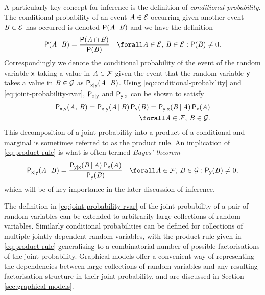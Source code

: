 A particularly key concept for inference is the definition of \emph{conditional probability}. The conditional probability of an event $\mathit{A} \in \mathcal{E}$ occurring given another event $\mathit{B} \in \mathcal{E}$ has occurred is denoted $\mathsf{P}(\mathit{A} \operatorname{|} \mathit{B})$ and we have the definition
\begin{equation}\label{eq:conditional-probability}
  \probability(\set{A} \gvn \set{B}) =
  \frac{\probability(\set{A} \cap \set{B})}{\probability(\set{B})}
  \quad \forall \set{A} \in \sset{E},\,\set{B} \in \sset{E} : \probability(\set{B}) \neq 0.
\end{equation}
Correspondingly we denote the conditional probability of the event of the random variable $\mathsf{x}$ taking a value in $\mathit{A} \in \mathcal{F}$ given the event that the random variable $\mathsf{y}$ takes a value in $\mathit{B} \in \mathcal{G}$ as $\mathsf{P}_{\mathsf{x}|\mathsf{y}}(\mathit{A}\operatorname{|}\mathit{B})$. Using \eqref{eq:conditional-probability} and \eqref{eq:joint-probability-rvar}, $\mathsf{P}_{\mathsf{x}|\mathsf{y}}$ and $\mathsf{P}_{\mathsf{y}|\mathsf{x}}$ can be shown to satisfy
\begin{equation}\label{eq:product-rule}
\begin{split}
  \prob{\rvar{x},\rvar{y}}(\set{A},\,\set{B}) =
  \prob{\rvar{x}|\rvar{y}}(\set{A} \gvn \set{B}) \, \prob{\rvar{y}}(\set{B}) =
  \prob{\rvar{y}|\rvar{x}}(\set{B} \gvn \set{A}) \, \prob{\rvar{x}}(\set{A})\\
  \forall \set{A} \in \sset{F},\,\set{B} \in \sset{G}.
\end{split}
\end{equation}
This decomposition of a joint probability into a product of a conditional and marginal is sometimes referred to as the product rule. An implication of \eqref{eq:product-rule} is what is often termed \emph{Bayes' theorem}
\begin{equation}\label{eq:bayes-theorem}
\begin{split}
  \prob{\rvar{x}|\rvar{y}}(\set{A} \gvn \set{B}) =
  \frac
    {\prob{\rvar{y}|\rvar{x}}(\set{B} \gvn \set{A}) \, \prob{\rvar{x}}(\set{A})}
    {\prob{\rvar{y}}(\set{B})} 
  \quad
  \forall \set{A} \in \sset{F},\,
  \set{B} \in \sset{G} : \prob{\rvar{y}}(\set{B}) \neq 0,
\end{split}
\end{equation}
which will be of key importance in the later discussion of inference.

The definition in \eqref{eq:joint-probability-rvar} of the joint probability of a pair of random variables can be extended to arbitrarily large collections of random variables. Similarly conditional probabilities can be defined for collections of multiple jointly dependent random variables, with the product rule given in \eqref{eq:product-rule} generalising to a combinatorial number of possible factorisations of the joint probability. Graphical models offer a convenient way of representing the dependencies between large collections of random variables and any resulting factorisation structure in their joint probability, and are discussed in Section \ref{sec:graphical-models}.

